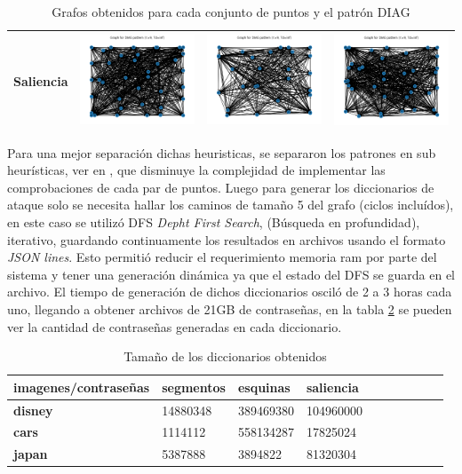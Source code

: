 \begin{table}[H]
\begin{tabular}{|c|c|c|c|}
		Saliencia & \includegraphics[width=3.5cm]{Graphics/disney-saliency-graph.png} 
		& \includegraphics[width=3.5cm]{Graphics/cars-saliency-graph.png} 
		& \includegraphics[width=3.5cm]{Graphics/japan-saliency-graph.png} \\ \hline
	\end{tabular}
	\caption{Grafos obtenidos para cada conjunto de puntos y el patr\'on DIAG}
	\label{graphs}
\end{table}


Para una mejor separaci\'on dichas heuristicas, se separaron los patrones en sub heur\'isticas, ver en \cite{van2010purely}, que disminuye la complejidad de implementar las comprobaciones de cada par de puntos. Luego para generar los diccionarios de ataque solo se necesita hallar los caminos de tama\~no 5 del grafo (ciclos inclu\'idos), en este caso se utiliz\'o DFS \textit{Depht First Search}, (B\'usqueda en profundidad), iterativo, guardando continuamente los resultados en archivos usando el formato \textit{JSON lines}. Esto permiti\'o reducir el requerimiento memoria ram por parte del sistema y tener una generaci\'on  din\'amica ya que el estado del DFS se guarda en el archivo. El tiempo de generaci\'on de dichos diccionarios oscil\'o de 2 a 3 horas cada uno, llegando a obtener archivos de 21GB de contrase\~nas, en la tabla \ref{dictionary:lengths} se pueden ver la cantidad de contrase\~nas generadas en cada diccionario.  

\begin{table}[H]
	\centering
	\caption{Tama\~no de los diccionarios obtenidos}
	\label{dictionary:lengths}
	\begin{tabular}{|l|l|l|l|l|l|l|l|l|l|}
		\hline
		\textbf{imagenes/contrase\~nas} & \textbf{segmentos} & \textbf{esquinas} & \textbf{saliencia }  \\ \hline
		\textbf{disney} & 14880348 & 389469380 & 104960000  \\ \hline
		\textbf{cars} & 1114112 & 558134287 & 17825024  \\ \hline
		\textbf{japan} & 5387888 & 3894822 & 81320304 \\ \hline
	\end{tabular}
\end{table}


